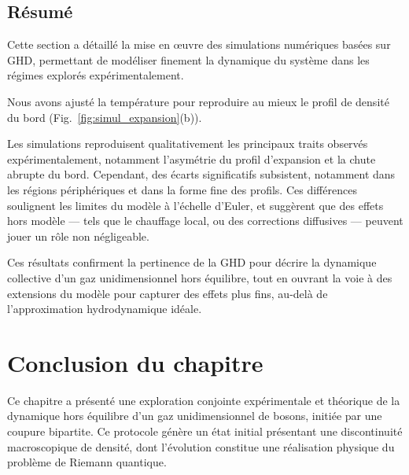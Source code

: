 \subsection*{Résumé}

Cette section a détaillé la mise en œuvre des simulations numériques basées sur \gls*{GHD}, permettant de modéliser finement la dynamique du système dans les régimes explorés expérimentalement.

\medskip

Nous avons ajusté la température pour reproduire au mieux le profil de densité du bord (Fig.~\ref{fig:simul_expansion}(b)).

Les simulations reproduisent qualitativement les principaux traits observés expérimentalement, notamment l’asymétrie du profil d’expansion et la chute abrupte du bord. Cependant, des écarts significatifs subsistent, notamment dans les régions périphériques et dans la forme fine des profils. Ces différences soulignent les limites du modèle à l’échelle d’Euler, et suggèrent que des effets hors modèle — tels que  le chauffage local, ou des corrections diffusives — peuvent jouer un rôle non négligeable.

\medskip

Ces résultats confirment la pertinence de la \gls*{GHD} pour décrire la dynamique collective d’un gaz unidimensionnel hors équilibre, tout en ouvrant la voie à des extensions du modèle pour capturer des effets plus fins, au-delà de l’approximation hydrodynamique idéale.

\section*{Conclusion du chapitre}

Ce chapitre a présenté une exploration conjointe expérimentale et théorique de la dynamique hors équilibre d’un gaz unidimensionnel de bosons, initiée par une coupure bipartite. Ce protocole génère un état initial présentant une discontinuité macroscopique de densité, dont l’évolution constitue une réalisation physique du problème de Riemann quantique.

